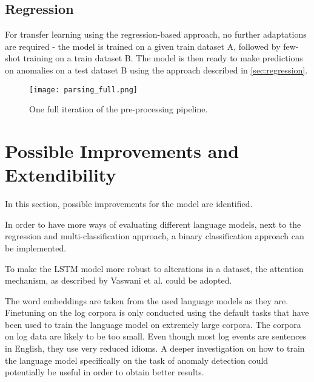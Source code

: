 \subsection{Regression \label{sec:transfer_regression}}
For transfer learning using the regression-based approach, no further adaptations are required - the model is trained on a given train dataset A, followed by few-shot training on a train dataset B. The model is then ready to make predictions on anomalies on a test dataset B using the approach described in \ref{sec:regression}.



\begin{figure}[htb]
  \centering
  \texttt{[image: parsing\_full.png]}\\
  \caption{One full iteration of the pre-processing pipeline.}
  \label{fig:full_preprocessing_pipeline}
\end{figure}


\section{Possible Improvements and Extendibility\label{sec:improvements}}
In this section, possible improvements for the model are identified. 

In order to have more ways of evaluating different language models, next to the regression and multi-classification approach, a binary classification approach can be implemented.

To make the LSTM model more robust to alterations in a dataset, the attention mechanism, as described by Vaswani et al. \cite{vaswani2017attention} could be adopted.

The word embeddings are taken from the used language models as they are. Finetuning on the log corpora is only conducted using the default tasks that have been used to train the language model on extremely large corpora. The corpora on log data are likely to be too small. Even though most log events are sentences in English, they use very reduced idioms. A deeper investigation on how to train the language model specifically on the task of anomaly detection could potentially be useful in order to obtain better results.






